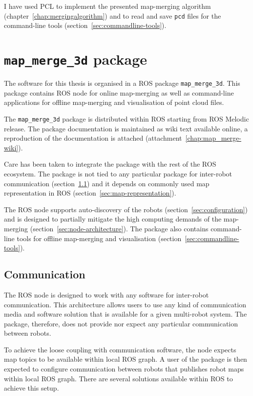 I have used \gls{PCL} to implement the presented map-merging algorithm (chapter~\ref{chap:mergingalgorithm}) and to read and save \texttt{pcd} files for the command-line tools (section~\ref{sec:commandline-tools}).


\section{\texttt{map\_merge\_3d} package}
\label{sec:ros-package}

The software for this thesis is organised in a \gls{ROS} package \texttt{map\_merge\_3d}. This package contains \gls{ROS} node for online map-merging as well as command-line applications for offline map-merging and visualisation of point cloud files.

The \texttt{map\_merge\_3d} package is distributed within \gls{ROS} starting from \gls{ROS} Melodic release. The package documentation is maintained as wiki text available online, a reproduction of the documentation is attached (attachment~\ref{chap:map_merge-wiki}).

Care has been taken to integrate the package with the rest of the \gls{ROS} ecosystem. The package is not tied to any particular package for inter-robot communication (section~\ref{sec:communication}) and it depends on commonly used map representation in \gls{ROS} (section~\ref{sec:map-representation}).

The \gls{ROS} node supports auto-discovery of the robots (section~\ref{sec:configuration}) and is designed to partially mitigate the high computing demands of the map-merging (section~\ref{sec:node-architecture}). The package also contains command-line tools for offline map-merging and visualisation (section~\ref{sec:commandline-tools}).

\subsection{Communication}
\label{sec:communication}

The \gls{ROS} node is designed to work with any software for inter-robot communication. This architecture allows users to use any kind of communication media and software solution that is available for a given multi-robot system. The package, therefore, does not provide nor expect any particular communication between robots.

To achieve the loose coupling with communication software, the node expects map topics to be available within local \gls{ROS} graph. A user of the package is then expected to configure communication between robots that publishes robot maps within local \gls{ROS} graph. There are several solutions available within \gls{ROS} to achieve this setup.

